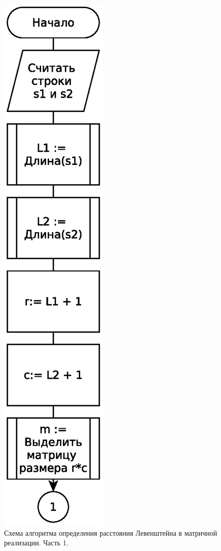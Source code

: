 \begin{figure}
    \centering
    \includegraphics[height=0.75\textheight]{schemes/levenshtein-iterative-eps-1}
    \caption{Схема алгоритма определения расстояния Левенштейна в матричной реализации. Часть 1.}
    \label{levenshtein-iterative-scheme-part-1}
\end{figure}


